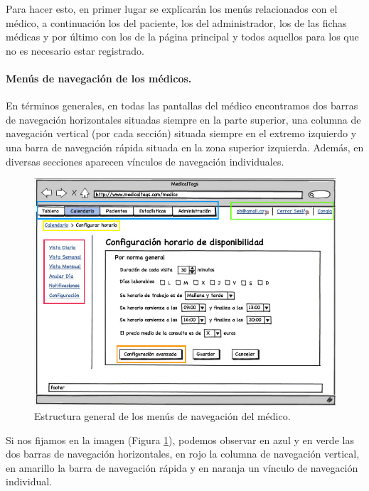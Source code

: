 \documentclass[a4paper,oneside,11pt]{book}
\begin{document}
		Para hacer esto, en primer lugar se explicarán los menús relacionados con el médico, a continuación los del paciente, los del administrador, los de las fichas médicas y por último con los de la página principal y todos aquellos para los que no es necesario estar registrado.
		
		
	
		\paragraph{Menús de navegación de los médicos.} %
		\label{par:nav_menus_de_navegacion_de_los_medicos}
		
			En términos generales, en todas las pantallas del médico encontramos dos barras de navegación horizontales situadas siempre en la parte superior, una columna de navegación vertical (por cada sección) situada siempre en el extremo izquierdo y una barra de navegación rápida situada en la zona superior izquierda. Además, en diversas secciones aparecen vínculos de navegación individuales.
			
			\begin{figure}[H]
			  \centering
			    \includegraphics[width=15cm]{img/jpg/nav/medico.jpg}
			  \caption{Estructura general de los menús de navegación del médico.}
			  \label{fig:nav_medico}
			\end{figure}
			
			Si nos fijamos en la imagen (Figura \ref{fig:nav_medico}), podemos observar en azul y en verde las dos barras de navegación horizontales, en rojo la columna de navegación vertical, en amarillo la barra de navegación rápida y en naranja un vínculo de navegación individual.
			
\end{document}
